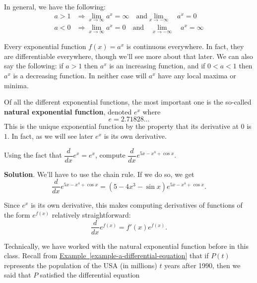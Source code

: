 \documentclass[10pt,]{book}
\newcommand{\terminology}[1]{\textbf{#1}}
\theoremstyle{ptxplainnotitle}
\theoremstyle{ptxplaintitle}
\theoremstyle{ptxplainnotitle}
\theoremstyle{ptxplaintitle}
\theoremstyle{ptxplainnotitle}
\theoremstyle{ptxplaintitle}
\theoremstyle{ptxdefinitionnotitle}
\theoremstyle{ptxdefinitiontitle}
\theoremstyle{ptxdefinitionnotitle}
\theoremstyle{ptxdefinitiontitle}
\theoremstyle{ptxdefinitionnotitle}
\theoremstyle{ptxdefinitiontitle}
\theoremstyle{ptxdefinitionnotitle}
\theoremstyle{ptxdefinitiontitle}
\theoremstyle{ptxdefinitionnotitle}
\theoremstyle{ptxdefinitiontitle}
\numberwithin{equation}{section}
\newcommand{\dv}[3][]{\dfrac{d^{#1} #2}{d #3^{#1}}}
\begin{document}
\hypertarget{p-190}{}%
In general, we have the following:%
\begin{align*}
a > 1 & \Rightarrow \lim_{x\to\infty}a^{x} = \infty\quad\text{and}\lim_{x\to-\infty}\quad a^{x} = 0 \\
a < 0 & \Rightarrow \lim_{x\to\infty}a^{x} = 0\quad\text{and}\quad\lim_{x\to-\infty}\quad a^{x} = \infty 
\end{align*}
%
\par
\hypertarget{p-191}{}%
Every exponential function \(f(x) = a^{x}\) is continuous everywhere. In fact, they are differentiable everywhere, though we'll see more about that later. We can also say the following: if \(a > 1\) then \(a^{x}\) is an increasing function, and if \(0 < a < 1\) then \(a^{x}\) is a decreasing function. In neither case will \(a^{x}\) have any local maxima or minima.%
\par
\hypertarget{p-192}{}%
Of all the different exponential functions, the most important one is the so-called \terminology{natural exponential function}, denoted \(e^{x}\) where%
\begin{equation*}
e = 2.71828...
\end{equation*}
This is the unique exponential function by the property that its derivative at \(0\) is \(1\). In fact, as we will see later \(e^{x}\) is its own derivative.%
\begin{example}\label{example-exponential-derivative}
\hypertarget{p-193}{}%
Using the fact that \(\dv{}{x}e^{x} = e^{x}\), compute \(\dv{}{x}e^{5x - x^{4} + \cos x}\).%
\par\smallskip%
\noindent\textbf{Solution}.\hypertarget{solution-43}{}\quad%
\hypertarget{p-194}{}%
We'll have to use the chain rule. If we do so, we get%
\begin{equation*}
\dv{}{x}e^{5x - x^{4} + \cos x} = (5 - 4x^{3} - \sin x)e^{5x - x^{4} + \cos x}.
\end{equation*}
%
\end{example}
\hypertarget{p-195}{}%
Since \(e^{x}\) is its own derivative, this makes computing derivatives of functions of the form \(e^{f(x)}\) relatively straightforward:%
\begin{equation*}
\dv{}{x}e^{f(x)} = f'(x)e^{f(x)}.
\end{equation*}
%
\par
\hypertarget{p-196}{}%
Technically, we have worked with the natural exponential function before in this class. Recall from \hyperref[example-a-differential-equation]{Example~\ref{example-a-differential-equation}} that if \(P(t)\) represents the population of the USA (in millions) \(t\) years after 1990, then we said that \(P\) satisfied the differential equation%
\end{document}
